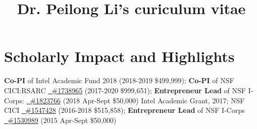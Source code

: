 \documentclass[11pt]{moderncv}
\title{Dr. Peilong Li's curiculum vitae}
\begin{document}
\maketitle

\section{Scholarly Impact and Highlights}
%
{\small 
\textbf{Co-PI} of Intel Academic Fund 2018
   (2018-2019 \$499,999);\newline
\textbf{Co-PI} of NSF CICI:RSARC \href{https://nsf.gov/awardsearch/showAward?AWD_ID=1738965}
  {\color{color1}\homepagesymbol~\#1738965} (2017-2020 \$999,651);\newline
\textbf{Entrepreneur Lead} of NSF I-Corps: \href{https://nsf.gov/awardsearch/showAward?AWD_ID=1823766}
  {\color{color1}\homepagesymbol~\#1823766} (2018 Apr-Sept \$50,000)
}
%
%
{\small 
  Intel Academic Grant, 2017; \newline
  NSF CICI \href{https://www.nsf.gov/awardsearch/showAward?AWD_ID=1547428}
  {\color{color1}\homepagesymbol~\#1547428} (2016-2018 \$515,858); \newline 
  \textbf{Entrepreneur Lead} of NSF I-Corps \href{https://www.nsf.gov/awardsearch/showAward?AWD_ID=1530989}
    {\color{color1}\homepagesymbol~\#1530989} (2015 Apr-Sept \$50,000)
}
%
%
\end{document}
